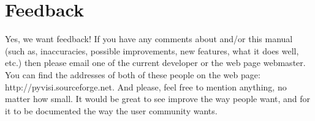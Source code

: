 \section*{Feedback}

Yes, we want feedback!  If you have any comments about \pyvisi and/or this
manual (such as, inaccuracies, possible improvements, new features, what it
does well, etc.) then please email one of the current developer or the \pyvisi
web page webmaster.  You can find the addresses of both of these people on the
\pyvisi web page: 
{http://pyvisi.sourceforge.net}.  And please, feel free to mention anything, no
matter how small.  It would be great to see \pyvisi improve the way people
want, and for it to be documented the way the \pyvisi user community wants.
